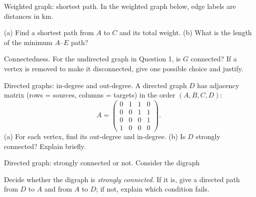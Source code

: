 \documentclass[11pt]{article}
\def\textbf#1{#1}%
\newcounter{question}
\begin{document}
\begin{question}
\textbf{Weighted graph: shortest path.}
In the weighted graph below, edge labels are distances in km.
\begin{center}
\end{center}
(a) Find a shortest path from $A$ to $C$ and its total weight.  
(b) What is the length of the minimum $A$–$E$ path?
\end{question}

\begin{question}
\textbf{Connectedness.}
For the undirected graph in Question 1, is $G$ connected? If a vertex is removed to make it disconnected, give one possible choice and justify.
\end{question}

\begin{question}
\textbf{Directed graphs: in-degree and out-degree.}
A directed graph $D$ has adjacency matrix (rows = sources, columns = targets) in the order $(A,B,C,D)$:
\[
A=\begin{pmatrix}
0&1&1&0\\
0&0&1&1\\
0&0&0&1\\
1&0&0&0
\end{pmatrix}.
\]
(a) For each vertex, find its out-degree and in-degree.  
(b) Is $D$ strongly connected? Explain briefly.
\end{question}

\begin{question}
\textbf{Directed graph: strongly connected or not.}
Consider the digraph
\begin{center}
\end{center}
Decide whether the digraph is \emph{strongly connected}. If it is, give a directed path from $D$ to $A$ and from $A$ to $D$; if not, explain which condition fails.
\end{question}
\end{document}
